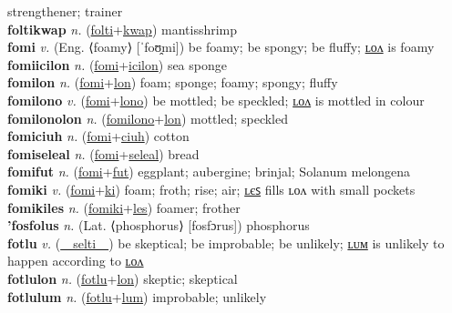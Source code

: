 strengthener; trainer \label{foltikiles} \\
\textbf{foltikwap} \textit{n.} (\hyperref[folti]{folti}+\hyperref[kwap]{kwap})
mantisshrimp \label{foltikwap} \\
\textbf{fomi} \textit{v.} (Eng. ⟨foamy⟩ [ˈfoʊ̯mi])
be foamy; be spongy; be fluffy; \hyperref[fomilon]{ʟᴏᴧ} is foamy \label{fomi} \\
\textbf{fomiicilon} \textit{n.} (\hyperref[fomi]{fomi}+\hyperref[icilon]{icilon})
sea sponge \label{fomiicilon} \\
\textbf{fomilon} \textit{n.} (\hyperref[fomi]{fomi}+\hyperref[lon]{lon})
foam; sponge; foamy; spongy; fluffy \label{fomilon} \\
\textbf{fomilono} \textit{v.} (\hyperref[fomi]{fomi}+\hyperref[lono]{lono})
be mottled; be speckled; \hyperref[fomilonolon]{ʟᴏᴧ} is mottled in colour \label{fomilono} \\
\textbf{fomilonolon} \textit{n.} (\hyperref[fomilono]{fomilono}+\hyperref[lon]{lon})
mottled; speckled \label{fomilonolon} \\
\textbf{fomiciuh} \textit{n.} (\hyperref[fomi]{fomi}+\hyperref[ciuh]{ciuh})
cotton \label{fomiciuh} \\
\textbf{fomiseleal} \textit{n.} (\hyperref[fomi]{fomi}+\hyperref[seleal]{seleal})
bread \label{fomiseleal} \\
\textbf{fomifut} \textit{n.} (\hyperref[fomi]{fomi}+\hyperref[fut]{fut})
eggplant; aubergine; brinjal; Solanum melongena \label{fomifut} \\
\textbf{fomiki} \textit{v.} (\hyperref[fomi]{fomi}+\hyperref[ki]{ki})
foam; froth; rise; air; \hyperref[fomikiles]{ʟєꜱ} fills ʟᴏᴧ with small pockets \label{fomiki} \\
\textbf{fomikiles} \textit{n.} (\hyperref[fomiki]{fomiki}+\hyperref[les]{les})
foamer; frother \label{fomikiles} \\
\textbf{'fosfolus} \textit{n.} (Lat. ⟨phosphorus⟩ [fosfɔrus])
phosphorus \label{'fosfolus} \\
\textbf{fotlu} \textit{v.} (\hyperref[selti]{~~selti~~})
be skeptical; be improbable; be unlikely; \hyperref[fotlulum]{ʟᴜᴍ} is unlikely to happen according to \hyperref[fotlulon]{ʟᴏᴧ} \label{fotlu} \\
\textbf{fotlulon} \textit{n.} (\hyperref[fotlu]{fotlu}+\hyperref[lon]{lon})
skeptic; skeptical \label{fotlulon} \\
\textbf{fotlulum} \textit{n.} (\hyperref[fotlu]{fotlu}+\hyperref[lum]{lum})
improbable; unlikely \label{fotlulum} \\
